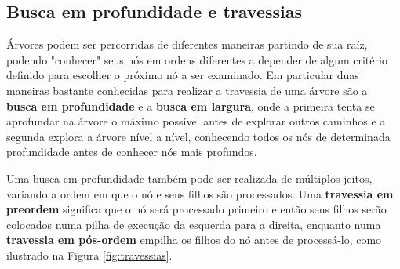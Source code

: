 \subsection{Busca em profundidade e travessias}
Árvores podem ser percorridas de diferentes maneiras partindo de sua raíz, podendo
"conhecer" seus nós em ordens diferentes a depender de algum critério definido para
escolher o próximo nó a ser examinado. Em particular duas maneiras bastante conhecidas
para realizar a travessia de uma árvore são a \textbf{busca em profundidade} e a
\textbf{busca em largura}, onde a primeira tenta se aprofundar na árvore o máximo
possível antes de explorar outros caminhos e a segunda explora a árvore nível a nível,
conhecendo todos os nós de determinada profundidade antes de conhecer nós mais profundos.

Uma busca em profundidade também pode ser realizada de múltiplos jeitos, variando a ordem
em que o nó e seus filhos são processados. Uma \textbf{travessia em preordem} significa
que o nó será processado primeiro e então seus filhos serão colocados numa pilha de
execução da esquerda para a direita, enquanto numa \textbf{travessia em pós-ordem}
empilha os filhos do nó antes de processá-lo, como ilustrado na Figura
\ref{fig:travessias}.


